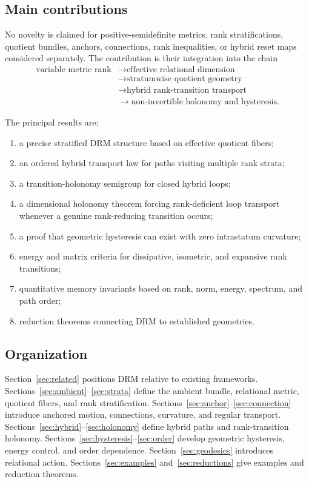 \documentclass[11pt]{article}
\begin{document}
\subsection{Main contributions}

No novelty is claimed for positive-semidefinite metrics, rank
stratifications, quotient bundles, anchors, connections, rank inequalities,
or hybrid reset maps considered separately. The contribution is their
integration into the chain
\[
\begin{aligned}
\text{variable metric rank}
&\longrightarrow \text{effective relational dimension}
\\
&\longrightarrow \text{stratumwise quotient geometry}
\\
&\longrightarrow \text{hybrid rank-transition transport}
\\
&\longrightarrow \text{non-invertible holonomy and hysteresis}.
\end{aligned}
\]

The principal results are:
\begin{enumerate}[label=(\roman*)]
\item a precise stratified DRM structure based on effective quotient fibers;
\item an ordered hybrid transport law for paths visiting multiple rank strata;
\item a transition-holonomy semigroup for closed hybrid loops;
\item a dimensional holonomy theorem forcing rank-deficient loop transport
whenever a genuine rank-reducing transition occurs;
\item a proof that geometric hysteresis can exist with zero intrastatum
curvature;
\item energy and matrix criteria for dissipative, isometric, and expansive
rank transitions;
\item quantitative memory invariants based on rank, norm, energy, spectrum,
and path order;
\item reduction theorems connecting DRM to established geometries.
\end{enumerate}

\subsection{Organization}

Section~\ref{sec:related} positions DRM relative to existing frameworks.
Sections~\ref{sec:ambient}--\ref{sec:strata} define the ambient bundle,
relational metric, quotient fibers, and rank stratification.
Sections~\ref{sec:anchor}--\ref{sec:connection} introduce anchored motion,
connections, curvature, and regular transport.
Sections~\ref{sec:hybrid}--\ref{sec:holonomy} define hybrid paths and
rank-transition holonomy.
Sections~\ref{sec:hysteresis}--\ref{sec:order} develop geometric hysteresis,
energy control, and order dependence.
Section~\ref{sec:geodesics} introduces relational action.
Sections~\ref{sec:examples} and~\ref{sec:reductions} give examples and
reduction theorems.
\end{document}

